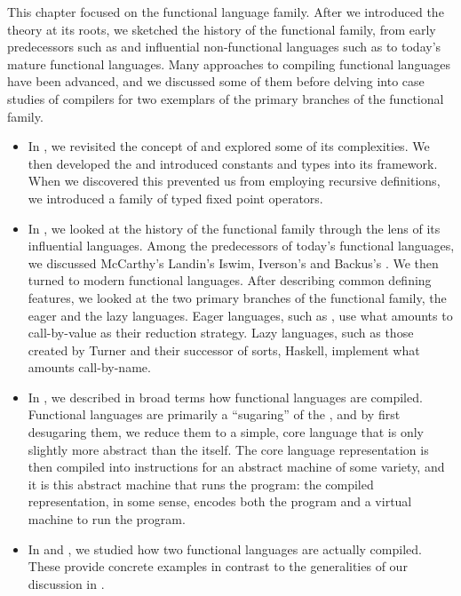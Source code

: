\label{functional:conclusion}
This chapter focused on the functional language family. After we introduced the theory at its roots, we sketched the history of the functional family, from early predecessors such as  and influential non-functional languages such as  to today's mature functional languages. Many approaches to compiling functional languages have been advanced, and we discussed some of them before delving into case studies of compilers for two exemplars of the primary branches of the functional family.

\begin{itemize}
\item In , we revisited the concept of  and explored some of its complexities. We then developed the \lambdacalc and introduced constants and types into its framework. When we discovered this prevented us from employing recursive definitions, we introduced a family of typed fixed point operators.

\item In , we looked at the history of the functional family through the lens of its influential languages. Among the predecessors of today's functional languages, we discussed McCarthy's  Landin's Iswim, Iverson's  and Backus's . We then turned to modern functional languages. After describing common defining features, we looked at the two primary branches of the functional family, the eager and the lazy languages. Eager languages, such as , use what amounts to call-by-value as their reduction strategy. Lazy languages, such as those created by Turner and their successor of sorts, Haskell, implement what amounts call-by-name.

\item In , we described in broad terms how functional languages are compiled. Functional languages are primarily a ``sugaring'' of the \lambdacalc{}, and by first desugaring them, we reduce them to a simple, core language that is only slightly more abstract than the \lambdacalc itself.%
The core language representation is then compiled into instructions for an abstract machine of some variety, and it is this abstract machine that runs the program: the compiled representation, in some sense, encodes both the program and a virtual machine to run the program.

\item In  and , we studied how two functional languages are actually compiled. These provide concrete examples in contrast to the generalities of our discussion in .
\end{itemize}